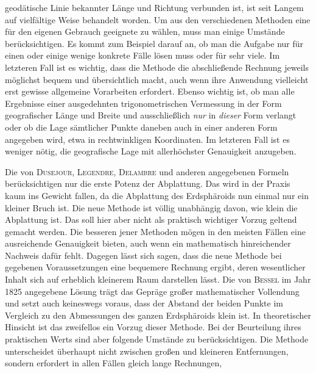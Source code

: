 %
geodätische Linie bekannter Länge und Richtung verbunden ist, ist seit Langem auf vielfältige Weise behandelt worden. Um aus den verschiedenen Methoden eine für den eigenen Gebrauch geeignete zu wählen, muss man einige Umstände berücksichtigen. Es kommt zum Beispiel darauf an, ob man die Aufgabe nur für einen oder einige wenige konkrete Fälle lösen muss oder für sehr viele. Im letzteren Fall ist es wichtig, dass die Methode die abschließende Rechnung jeweils möglichst bequem und übersichtlich macht, auch wenn ihre Anwendung vielleicht erst gewisse allgemeine Vorarbeiten erfordert. Ebenso wichtig ist, ob man alle Ergebnisse einer ausgedehnten trigonometrischen Vermessung in der Form geografischer Länge und Breite und ausschließlich \textit{nur} in \textit{dieser} Form verlangt oder ob die Lage sämtlicher Punkte daneben auch in einer anderen Form angegeben wird, etwa in rechtwinkligen Koordinaten. Im letzteren Fall ist es weniger nötig, die geografische Lage mit allerhöchster Genauigkeit anzugeben.

Die von \textsc{Dusejour}, \textsc{Legendre}, \textsc{Delambre} und anderen angegebenen Formeln berücksichtigen nur die erste Potenz der Abplattung. Das wird in der Praxis kaum ins Gewicht fallen, da die Abplattung des Erdsphäroids nun einmal nur ein kleiner Bruch ist. Die neue Methode ist völlig unabhängig davon, wie klein die Abplattung ist. Das soll hier aber nicht als praktisch wichtiger Vorzug geltend gemacht werden. Die besseren jener Methoden mögen in den meisten Fällen eine ausreichende Genauigkeit bieten, auch wenn ein mathematisch hinreichender Nachweis dafür fehlt. Dagegen lässt sich sagen, dass die neue Methode bei gegebenen Voraussetzungen eine bequemere Rechnung ergibt, deren wesentlicher Inhalt sich auf erheblich kleinerem Raum darstellen lässt. Die von \textsc{Bessel} im Jahr 1825 angegebene Lösung trägt das Gepräge großer mathematischer Vollendung und setzt auch keineswegs voraus, dass der Abstand der beiden Punkte im Vergleich zu den Abmessungen des ganzen Erdsphäroids klein ist. In theoretischer Hinsicht ist das zweifellos ein Vorzug dieser Methode. Bei der Beurteilung ihres praktischen Werts sind aber folgende Umstände zu berücksichtigen. Die Methode unterscheidet überhaupt nicht zwischen großen und kleineren Entfernungen, sondern erfordert in allen Fällen gleich lange Rechnungen,
